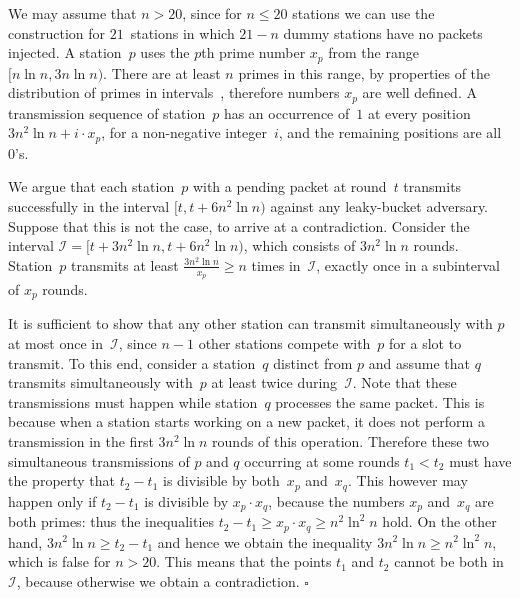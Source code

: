 \documentclass[11pt]{article}
\newcommand{\cI}{\mathcal{I}}
\newcommand{\qed}{\hfill $\square$ \smallbreak}
\newenvironment{proof}{\noindent{\bf Proof:}}{\qed}
\begin{document}
\begin{proof}
We may assume that $n> 20$, since for  $n\le 20$ stations  we can use the construction for $21$~stations in which $21-n$ dummy stations have no packets injected.
A station~$p$ uses the $p$th prime number $x_p$ from the range $[n\ln n,3n\ln n)$.
There are at least $n$ primes in this range, by properties of the distribution of primes in intervals~\cite{Ribenboim-book1996}, therefore numbers $x_p$ are well defined.
A transmission sequence of station~$p$ has an occurrence of~$1$ at every position $3n^2\ln n +i\cdot x_p$, for a non-negative integer~$i$, and the remaining positions are all~$0$'s.

We argue that each station~$p$ with a pending packet at round~$t$ transmits successfully in the interval $[t,t+6n^2\ln n)$ against any leaky-bucket adversary.
Suppose that this is not the case, to arrive at a contradiction.
Consider the interval $\cI=[t+3n^2\ln n,t+6n^2\ln n)$, which consists of $3n^2\ln n$ rounds.
Station~$p$ transmits at least $\frac{3n^2\ln n}{x_p}\ge n$ times  in~$\cI$, exactly once in a  subinterval of $x_p$ rounds.

It is sufficient to show that any other station can transmit simultaneously with $p$
at most once in~$\cI$, since $n-1$ other stations compete with~$p$ for a slot to transmit.
To this end, consider a station~$q$ distinct from $p$ and assume that $q$ transmits simultaneously with~$p$ at least twice during~$\cI$.
Note that these transmissions must happen while station~$q$ processes the same packet.
This is because when a station starts working on a new packet, it does not perform a transmission in the first $3n^2\ln n$ rounds of this operation.
Therefore these two simultaneous transmissions of $p$ and $q$ occurring at some rounds $t_1<t_2$ must have the property that $t_2-t_1$ is divisible by both~$x_p$ and~$x_q$.
This however may happen only if $t_2-t_1$ is divisible by $x_p\cdot x_q$, because the numbers $x_p$ and~$x_q$ are both primes: thus the inequalities $t_2-t_1\ge x_p\cdot x_q \ge n^2\ln^2 n$ hold.
On the other hand, $3 n^2 \ln n \ge t_2-t_1$ and hence we obtain the inequality $3n^2\ln n \ge n^2\ln^2 n$, which is false for $n>20$. 
This means that  the points $t_1$ and $t_2$ cannot be both in~$\cI$, because otherwise we obtain a contradiction.
\end{proof}
\end{document}
